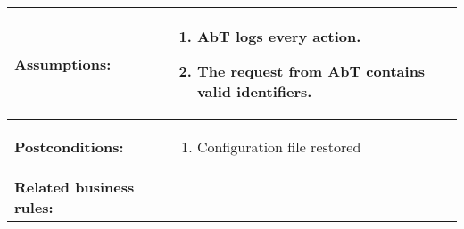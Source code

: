 \begin{tabularx}{\linewidth}{|l|X|}
\hline
\textbf{Assumptions:} & \begin{enumerate} 
							\item AbT logs every action.
							\item The request from AbT contains valid identifiers.
						\end{enumerate} \\
\hline
\textbf{Postconditions:} & 
  \begin{minipage}{\linewidth}
  \vspace{0.05em}
  \begin{enumerate}
    \item Configuration file restored
  \end{enumerate}
  \vspace{0.05em}
\end{minipage}
\\
\hline
\textbf{Related business rules:} & - \\
\hline
\end{tabularx}


